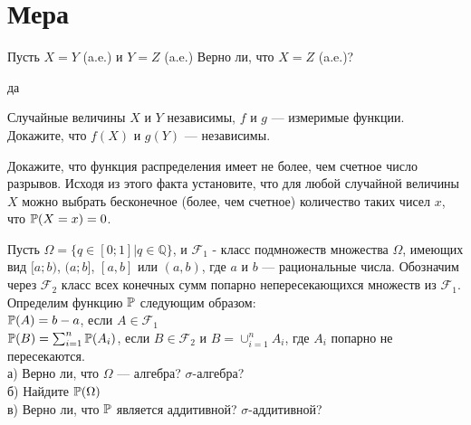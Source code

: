 \section{Мера}

\begin{problem}
Пусть $X=Y$ (a.e.) и $Y=Z$ (a.e.) Верно ли, что $X=Z$ (a.e.)?

\begin{sol}
да
\end{sol}
\end{problem}

\begin{problem}
Случайные величины $X$ и $Y$ независимы, $f$ и $g$ — измеримые
функции. Докажите, что $f(X)$ и $g(Y)$ — независимы.

\begin{sol}

\end{sol}
\end{problem}

\begin{problem}
Докажите, что функция распределения имеет не более, чем счетное
число разрывов. Исходя из этого факта установите, что для любой
случайной величины $X$ можно выбрать бесконечное (более, чем
счетное) количество таких чисел $x$, что $\P(X=x)=0$.

\begin{sol}

\end{sol}
\end{problem}

\begin{problem}
Пусть $\Omega=\{q\in[0;1]|q\in\mathbb{Q}\}$, и $\mathcal{F}_{1}$ -
класс подмножеств множества $\Omega$, имеющих вид $[a;b)$,
$(a;b]$, $[a,b]$ или $(a,b)$, где $a$ и $b$ — рациональные числа.
Обозначим через $\mathcal{F}_{2}$ класс всех конечных сумм попарно
непересекающихся множеств из $\mathcal{F}_{1}$. Определим
функцию $\P$ следующим образом: \\
$\P(A)=b-a$, если $A\in \mathcal{F}_{1}$ \\
$\P(B)=\sum_{i=1}^{n}\P(A_{i})$, если $B\in
\mathcal{F}_{2}$ и $B=\cup_{i=1}^{n}A_{i}$, где $A_{i}$ попарно не
пересекаются. \\
а) Верно ли, что $\Omega$ — алгебра? $\sigma$-алгебра? \\
б) Найдите $\P(\Omega)$ \\
в) Верно ли, что $\P$ является аддитивной?
$\sigma$-аддитивной?

\begin{sol}

\end{sol}
\end{problem}


